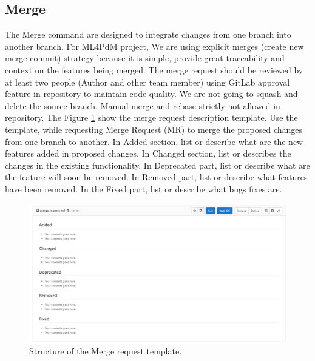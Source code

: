 \subsection{Merge}
The Merge command are designed to integrate changes from one branch into another branch. For ML4PdM project, We are using explicit merges (create new merge commit) strategy because it is simple, provide great traceability and context on the features being merged. The merge request should be reviewed by at least two people (Author and other team member) using GitLab approval feature in repository to maintain code quality. We are not going to squash and delete the source branch. Manual merge and rebase strictly not allowed in repository. The Figure \ref{fig:merge-request-template} show the merge request description template. Use the template, while requesting Merge Request (MR) to merge the proposed changes from one branch to another. In Added section, list or describe what are the new features added in proposed changes. In Changed section, list or describes the changes in the existing functionality. In Deprecated part, list or describe what are the feature will soon be removed. In Removed part, list or describe what features have been removed. In the Fixed part, list or describe what bugs fixes are.
\begin{figure}[ht]
	\centering
	\includegraphics[width=\textwidth]{gfx/merge-request-template.PNG}
	\captionsetup{justification=centering}
	\caption{Structure of the Merge request template.}
	\label{fig:merge-request-template}
\end{figure}
